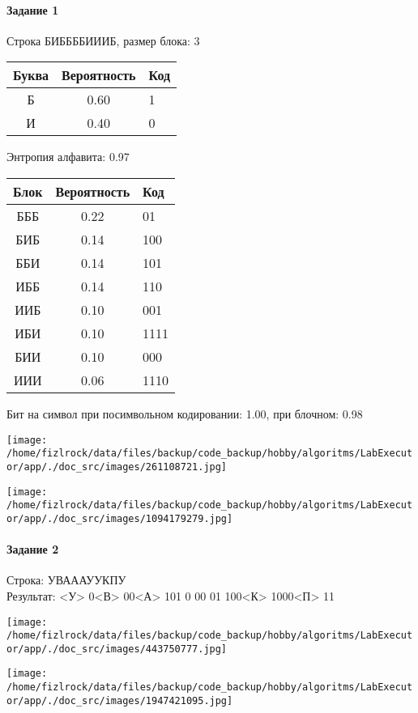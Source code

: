 \documentclass[a4paper, 12pt]{article}
\begin{document}
\paragraph{Задание 1}

Строка БИББББИИИБ, размер блока: 3
\begin{center}
 \begin{tabular}{ |c|c|l| } 
  \hline
     Буква & Вероятность & Код\\ \hline
Б & 0.60 & 1\\\hline
И & 0.40 & 0
\\ \hline \end{tabular}
\end{center}
Энтропия алфавита: 0.97
\begin{center}
 \begin{tabular}{ |c|c|l| } 
  \hline
     Блок & Вероятность & Код\\ \hline
БББ & 0.22 & 01\\\hline
БИБ & 0.14 & 100\\\hline
ББИ & 0.14 & 101\\\hline
ИББ & 0.14 & 110\\\hline
ИИБ & 0.10 & 001\\\hline
ИБИ & 0.10 & 1111\\\hline
БИИ & 0.10 & 000\\\hline
ИИИ & 0.06 & 1110
\\ \hline \end{tabular}
\end{center}
Бит на символ при посимвольном кодировании: 1.00, при блочном: 0.98

\texttt{[image: /home/fizlrock/data/files/backup/code\_backup/hobby/algoritms/LabExecutor/app/./doc\_src/images/261108721.jpg]}

\texttt{[image: /home/fizlrock/data/files/backup/code\_backup/hobby/algoritms/LabExecutor/app/./doc\_src/images/1094179279.jpg]}
\pagebreak
\paragraph{Задание 2}

Строка: 
УВАААУУКПУ\\
Результат: <У> 0<В> 00<А> 101 0 00 01 100<К> 1000<П> 11

\texttt{[image: /home/fizlrock/data/files/backup/code\_backup/hobby/algoritms/LabExecutor/app/./doc\_src/images/443750777.jpg]}

\texttt{[image: /home/fizlrock/data/files/backup/code\_backup/hobby/algoritms/LabExecutor/app/./doc\_src/images/1947421095.jpg]}
\end{document}
